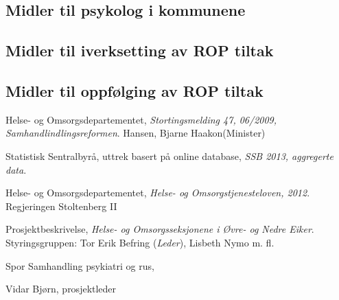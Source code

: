 \documentclass[11pt]{report} %
\begin{document}
                  \subsection{Midler til psykolog i kommunene}
                  \subsection{Midler til iverksetting av ROP tiltak}
                  \subsection{Midler til oppfølging av ROP tiltak}


              \renewcommand{\bibname}{Kilder:}
              \begin{thebibliography}{99}

                  Helse- og Omsorgsdepartementet,
                  \emph{Stortingsmelding 47, 06/2009, Samhandlindlingsreformen}.
                  Hansen, Bjarne Haakon(Minister)

                  Statistisk Sentralbyrå, uttrek basert på online database,
                  \emph{SSB 2013, aggregerte data}.

                  Helse- og Omsorgsdepartementet,
                  \emph{Helse- og Omsorgstjenesteloven, 2012}.
                  Regjeringen Stoltenberg II

                  Prosjektbeskrivelse,
                  \emph{Helse- og Omsorgsseksjonene i Øvre- og Nedre Eiker}.
                  Styringsgruppen: Tor Erik Befring (\emph{Leder}), Lisbeth Nymo m. fl.

                  Spor Samhandling psykiatri og rus,
                  Vidar Bjørn, prosjektleder \href{mailto:vibjoe@siv.no}{}\\


\end{thebibliography}
\end{document}
